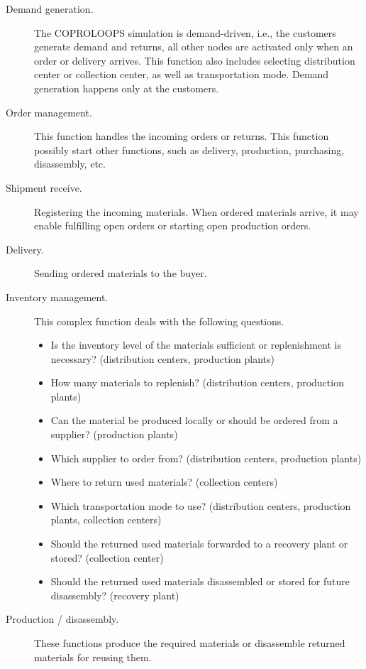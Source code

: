 \documentclass{article}
\newcommand{\NAME}{COPROLOOPS }
\begin{document}
\begin{description}
\item[Demand generation.] The \NAME simulation is demand-driven, i.e., the customers generate demand and returns, all other nodes are activated only when an order or delivery arrives. This function also includes selecting distribution center or collection center, as well as transportation mode. Demand generation happens only at the customers.

\item[Order management.] This function handles the incoming orders or returns. This function possibly start other functions, such as delivery, production, purchasing, disassembly, etc.

\item[Shipment receive.] Registering the incoming materials. When ordered materials arrive, it may enable fulfilling open orders or starting open production orders.

\item[Delivery.] Sending ordered materials to the buyer.

\item[Inventory management.] This complex function deals with the following questions.
\begin{itemize}
\item Is the inventory level of the materials sufficient or replenishment is necessary? (distribution centers, production plants)
\item How many materials to replenish? (distribution centers, production plants)
\item Can the material be produced locally or should be ordered from a supplier? (production plants)
\item Which supplier to order from? (distribution centers, production plants)
\item Where to return used materials? (collection centers)
\item Which transportation mode to use? (distribution centers, production plants, collection centers)
\item Should the returned used materials forwarded to a recovery plant or stored? (collection center)
\item Should the returned used materials disassembled or stored for future disassembly? (recovery plant)
\end{itemize}

\item[Production / disassembly.] These functions produce the required materials or disassemble returned materials for reusing them.

\end{description}
\end{document}
